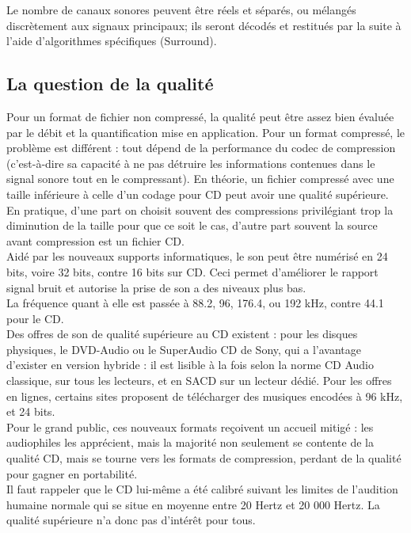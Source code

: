 \documentclass[12pt,a4paper]{report}
\begin{document}
Le nombre de canaux sonores peuvent être réels et séparés, ou mélangés discrètement aux signaux principaux; ils seront décodés et restitués par la suite à l'aide d'algorithmes spécifiques (Surround).\\


\subsection{La question de la qualité}
Pour un format de fichier non compressé, la qualité peut être assez bien évaluée par le débit et la quantification mise en application. Pour un format compressé, le problème est différent : tout dépend de la performance du codec de compression (c'est-à-dire sa capacité à ne pas détruire les informations contenues dans le signal sonore tout en le compressant). En théorie, un fichier compressé avec une taille inférieure à celle d'un codage pour CD peut avoir une qualité supérieure. En pratique, d'une part on choisit souvent des compressions privilégiant trop la diminution de la taille pour que ce soit le cas, d'autre part souvent la source avant compression est un fichier CD.\\

Aidé par les nouveaux supports informatiques, le son peut être numérisé en 24 bits, voire 32 bits, contre 16 bits sur CD. Ceci permet d'améliorer le rapport signal bruit et autorise la prise de son a des niveaux plus bas.\\

La fréquence quant à elle est passée à 88.2, 96, 176.4, ou 192 kHz, contre 44.1 pour le CD.\\

Des offres de son de qualité supérieure au CD existent : pour les disques physiques, le DVD-Audio ou le SuperAudio CD de Sony, qui a l'avantage d'exister en version hybride : il est lisible à la fois selon la norme CD Audio classique, sur tous les lecteurs, et en SACD sur un lecteur dédié. Pour les offres en lignes, certains sites proposent de télécharger des musiques encodées à 96 kHz, et 24 bits.\\

Pour le grand public, ces nouveaux formats reçoivent un accueil mitigé : les audiophiles les apprécient, mais la majorité non seulement se contente de la qualité CD, mais se tourne vers les formats de compression, perdant de la qualité pour gagner en portabilité.\\

Il faut rappeler que le CD lui-même a été calibré suivant les limites de l'audition humaine normale qui se situe en moyenne entre 20 Hertz et 20 000 Hertz. La qualité supérieure n'a donc pas d'intérêt pour tous.\\
\end{document}
